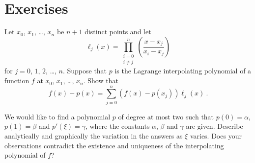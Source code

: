 \section{Exercises}

\begin{question}
Let $x_0$, $x_1$, \ldots, $x_n$ be $n+1$ distinct points and let
\[
\ell_j(x) = \prod_{\substack{i=0\\i\neq j}}^n \left(\frac{x-x_j}{x_i-x_j}\right)
\]
for $j=0$, $1$, $2$, \ldots, $n$.  Suppose that $p$ is the Lagrange
interpolating polynomial of a function $f$ at $x_0$, $x_1$, \ldots,
$x_n$.  Show that
\[
f(x) - p(x) = \sum_{j=0}^n \left(f(x)-p(x_j)\right) \ell_j(x) \ .
\]
\end{question}


\begin{question}
We would like to find a polynomial $p$ of degree at most two such that
$p(0) = \alpha$, $p(1) = \beta$ and $p'(\xi) = \gamma$, where the
constants $\alpha$, $\beta$ and $\gamma$ are given.  Describe
analytically and graphically the variation in the answers as $\xi$
varies.  Does your observations contradict the existence and uniqueness
of the interpolating polynomial of $f$?
\end{question}

